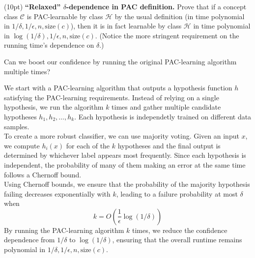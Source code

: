 \documentclass[11pt]{article}
\newcommand*{\C}{{\mathcal C}}
\newcommand*{\Hp}{{\mathcal H}}
\DeclareMathOperator{\1}{\mathbbm{1}}
\begin{document}
\begin{problem} (10pt) \textbf{``Relaxed'' $\delta$-dependence in PAC definition.}
Prove that if a concept class $\C$ is PAC-learnable by class $\Hp$ by the usual definition (in time polynomial in $1/\delta, 1/\epsilon, n, \text{size}(c)$), then it is in fact learnable by class $\Hp$ in time polynomial in $\log(1/\delta), 1/\epsilon, n, \text{size}(c)$. (Notice the more stringent requirement on the
running time's dependence on $\delta$.)
\end{problem}
\begin{hint}
	Can we boost our confidence by running the original PAC-learning algorithm multiple times?
\end{hint}
We start with a PAC-learning algorithm that outputs a hypothesis function $h$ satisfying the PAC-learning requirements. Instead of relying on a single hypothesis, we run the algorithm $k$ times and gather multiple candidate hypotheses $h_1, h_2, \ldots, h_k$. Each hypothesis is independetly trained on different data samples. \\
To create a more robust classifier, we can use majority voting. Given an input $x$, we compute $h_i(x)$ for each of the $k$ hypotheses and the final output is determined by whichever label appears most frequently. Since each hypothesis is independent, the probability of many of them making an error at the same time follows a Chernoff bound. \\
Using Chernoff bounds, we ensure that the probability of the majority hypothesis failing decreases exponentially with $k$, leading to a failure probability at most $\delta$ when $$k=O(\frac{1}{\epsilon} \log(1/\delta))$$ By running the PAC-learning algorithm $k$ times, we reduce the confidence dependence from $1/\delta$ to $\log(1/\delta)$, ensuring that the overall runtime remains polynomial in $1/\delta, 1/\epsilon, n, \text{size}(c)$.
\end{document}
